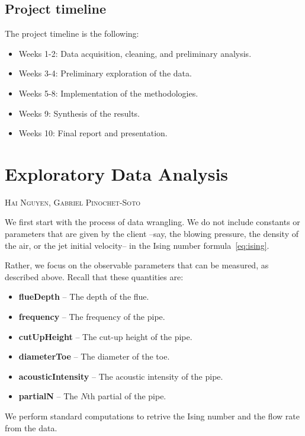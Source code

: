 \documentclass{psu-report}
\newcommand{\chapterauthor}[1]{%
  \vspace{-2em}
  {\large \textsc{#1}\par}
  \vspace{1.5em}
}
\begin{document}
\section{Project timeline}

The project timeline is the following:
\begin{itemize}
    \item Weeks 1-2: Data acquisition, cleaning, and preliminary analysis.
    \item Weeks 3-4: Preliminary exploration of the data.
    \item Weeks 5-8: Implementation of the methodologies.
    \item Weeks 9: Synthesis of the results.
    \item Weeks 10: Final report and presentation.
\end{itemize}




\chapter{Exploratory Data Analysis}

\chapterauthor{Hai Nguyen, Gabriel Pinochet-Soto}

We first start with the process of data wrangling.
We do not include constants or parameters that are given by the client --say,
the blowing pressure, the density of the air, or the jet initial velocity-- in
the Ising number formula~\ref{eq:ising}.

Rather, we focus on the observable parameters that can be measured, as described
above.
Recall that these quantities are:
\begin{itemize}
    \item \textbf{flueDepth} -- The depth of the flue.
    \item \textbf{frequency} -- The frequency of the pipe.
    \item \textbf{cutUpHeight} -- The cut-up height of the pipe.
    \item \textbf{diameterToe} -- The diameter of the toe.
    \item \textbf{acousticIntensity} -- The acoustic intensity of the pipe.
    \item \textbf{partialN} -- The \(N\)th partial of the pipe.
\end{itemize}
We perform standard computations to retrive the Ising number and the flow rate
from the data.
\end{document}

